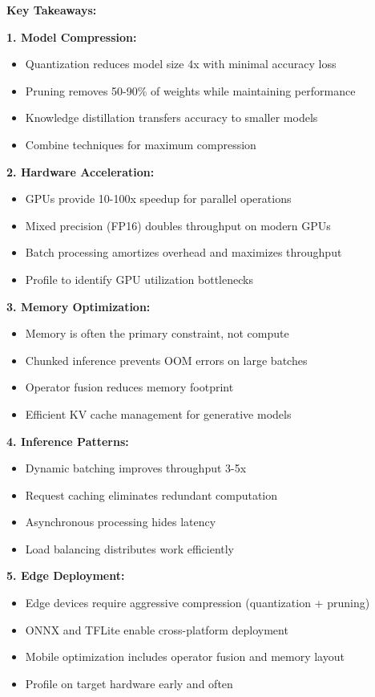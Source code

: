 \textbf{Key Takeaways:}

\textbf{1. Model Compression:}
\begin{itemize}
    \item Quantization reduces model size 4x with minimal accuracy loss
    \item Pruning removes 50-90\% of weights while maintaining performance
    \item Knowledge distillation transfers accuracy to smaller models
    \item Combine techniques for maximum compression
\end{itemize}

\textbf{2. Hardware Acceleration:}
\begin{itemize}
    \item GPUs provide 10-100x speedup for parallel operations
    \item Mixed precision (FP16) doubles throughput on modern GPUs
    \item Batch processing amortizes overhead and maximizes throughput
    \item Profile to identify GPU utilization bottlenecks
\end{itemize}

\textbf{3. Memory Optimization:}
\begin{itemize}
    \item Memory is often the primary constraint, not compute
    \item Chunked inference prevents OOM errors on large batches
    \item Operator fusion reduces memory footprint
    \item Efficient KV cache management for generative models
\end{itemize}

\textbf{4. Inference Patterns:}
\begin{itemize}
    \item Dynamic batching improves throughput 3-5x
    \item Request caching eliminates redundant computation
    \item Asynchronous processing hides latency
    \item Load balancing distributes work efficiently
\end{itemize}

\textbf{5. Edge Deployment:}
\begin{itemize}
    \item Edge devices require aggressive compression (quantization + pruning)
    \item ONNX and TFLite enable cross-platform deployment
    \item Mobile optimization includes operator fusion and memory layout
    \item Profile on target hardware early and often
\end{itemize}

